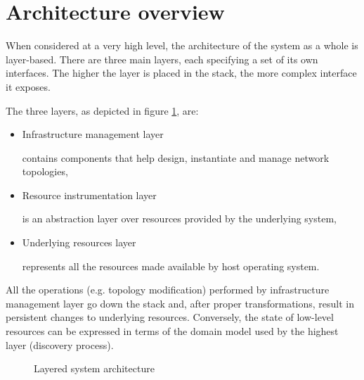 \documentclass[11pt]{book}
\begin{document}


    \section{Architecture overview}

      When considered at a very high level, the architecture of the system as a whole is layer-based. There are three
      main layers, each specifying a set of its own interfaces. The higher the layer is placed in the stack, the more
      complex interface it exposes.

      The three layers, as depicted in figure \ref{fig:arch:layers}, are:

      \begin{itemize}

        \item Infrastructure management layer

              contains components that help design, instantiate and manage network topologies,

        \item Resource instrumentation layer

              is an abstraction layer over resources provided by the underlying system,

        \item Underlying resources layer

              represents all the resources made available by host operating system.

      \end{itemize}

      All the operations (e.g. topology modification) performed by infrastructure management layer go down the stack
      and, after proper transformations, result in persistent changes to underlying resources. Conversely, the state of
      low-level resources can be expressed in terms of the domain model used by the highest layer (discovery process).

      \begin{figure}[H]
        \begin{center}
        \end{center}

        \caption{Layered system architecture}
        \label{fig:arch:layers}
      \end{figure}
\end{document}
